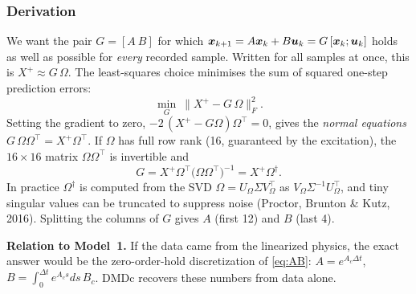\subsubsection*{Derivation}

We want the pair $G=[A\ B]$ for which $\bm{x}_{k+1}=A\bm{x}_k+B\bm{u}_k=G\,[\bm{x}_k;\bm{u}_k]$ holds as well as possible for
\emph{every} recorded sample. Written for all samples at once, this is $X^+\approx G\,\Omega$. The least-squares choice
minimises the sum of squared one-step prediction errors:
\[
  \min_G\ \big\|X^+-G\,\Omega\big\|_F^2 .
\]
Setting the gradient to zero, $-2\,(X^+-G\Omega)\Omega^\top=0$, gives the \emph{normal equations}
$G\,\Omega\Omega^\top=X^+\Omega^\top$. If $\Omega$ has full row rank (16, guaranteed by the excitation), the
$16\times16$ matrix $\Omega\Omega^\top$ is invertible and
\[
  G=X^+\Omega^\top\big(\Omega\Omega^\top\big)^{-1}=X^+\Omega^\dagger .
\]
In practice $\Omega^\dagger$ is computed from the SVD $\Omega=U_\Omega\Sigma V_\Omega^\top$ as
$V_\Omega\Sigma^{-1}U_\Omega^\top$, and tiny singular values can be truncated to suppress noise
(Proctor, Brunton \& Kutz, 2016). Splitting the columns of $G$ gives $A$ (first 12) and $B$ (last 4).

\textbf{Relation to Model~1.} If the data came from the linearized physics, the exact answer would be the
zero-order-hold discretization of \eqref{eq:AB}:
$A=e^{A_c\Delta t}$, $B=\int_0^{\Delta t}e^{A_cs}ds\,B_c$. DMDc recovers these numbers from data alone.

